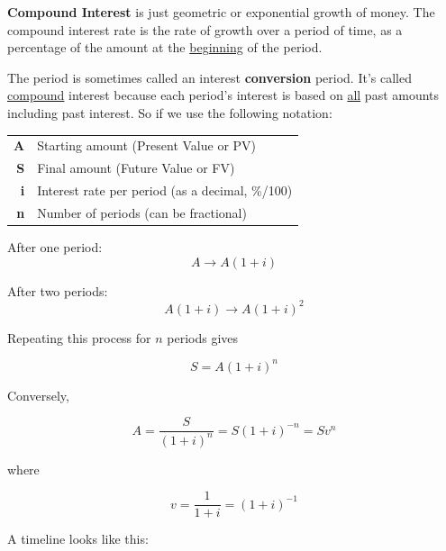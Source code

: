 \documentclass[14pt]{extarticle}
\begin{document}

\textbf{Compound Interest} is just geometric or exponential growth
of money.  The compound interest rate is the rate of growth over a period
of time, as a percentage of the amount at the \underline{beginning} of the period.

The period is sometimes called an interest \textbf{conversion} period. It's called \underline{compound}
interest because each period's interest is based on \underline{all} past amounts including past interest.  So
if we use the following notation:
\begin{center}
    \renewcommand{\arraystretch}{1.2}
    \begin{tabular}{rl}
        \textbf{A} & Starting amount (Present Value or PV)           \\
        \textbf{S} & Final amount (Future Value or FV)               \\
        \textbf{i} & Interest rate per period (as a decimal, \%/100) \\
        \textbf{n} & Number of periods (can be fractional)
    \end{tabular}
\end{center}

After one period:
\[
    A \rightarrow A(1+i)
\]

After two periods:
\[
    A(1+i) \rightarrow A(1+i)^2
\]

Repeating this process for $n$ periods gives

\[
    S = A(1+i)^n
\]

Conversely,

\[
    A = \frac{S}{(1+i)^n}
    = S(1+i)^{-n}
    = Sv^n
\]

where

\[
    v = \frac{1}{1+i} = (1+i)^{-1}
\]


\newpage
A timeline looks like this:
\end{document}

